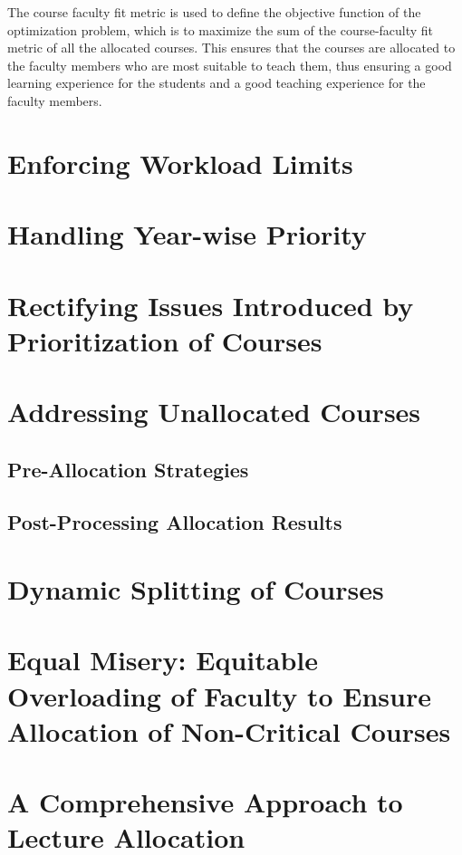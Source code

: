 The course faculty fit metric is used to define the objective function of the optimization problem, which is to maximize the sum of the course-faculty fit metric of all the allocated courses. This ensures that the courses are allocated to the faculty members who are most suitable to teach them, thus ensuring a good learning experience for the students and a good teaching experience for the faculty members.

\section{Enforcing Workload Limits}

\section{Handling Year-wise Priority}

\section{Rectifying Issues Introduced by Prioritization of Courses}

\section{Addressing Unallocated Courses}
\subsection{Pre-Allocation Strategies}
\subsection{Post-Processing Allocation Results}

\section{Dynamic Splitting of Courses}

\section{Equal Misery: Equitable Overloading of Faculty to Ensure Allocation of Non-Critical Courses}

\section{A Comprehensive Approach to Lecture Allocation}
